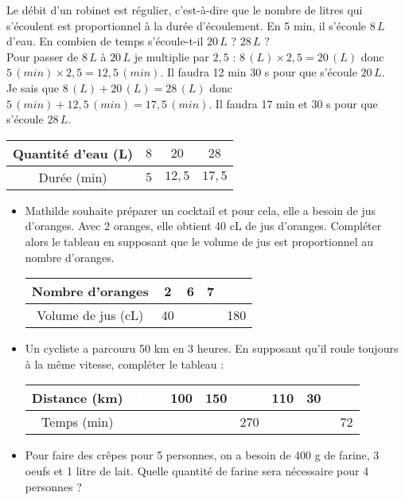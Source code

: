 \documentclass[a4paper,dvipsnames]{article}
\begin{document}
\begin{Ex}
Le débit d'un robinet est régulier, c'est-à-dire que le nombre de litres qui s'écoulent est proportionnel à la durée d'écoulement. En 5 min, il s'écoule $8 \,L$ d'eau. En combien de temps s'écoule-t-il $20 \,L$ ? $28\,L$ ?\\

Pour passer de $8\,L$ à $20\,L$ je multiplie par $2,5$ : $8\,(L)\times2,5=20\,(L)$ donc $5\,(min)\times2,5=12,5\,(min)$. Il faudra 12 min 30 s pour que s'écoule $20\,L$.\\
Je sais que $8\,(L)+20\,(L)=28\,(L)$ donc $5\,(min)+12,5\,(min)=17,5\,(min)$. Il faudra 17 min et 30 s pour que s'écoule $28\,L$.\\
\begin{center}
    \begin{tabular}{c||c|c|c}
        Quantité d'eau (L) & $8$ & $20$ & $28$  \\
        \hline Durée (min) & $5$ & $12,5$ & $17,5$ \\
    \end{tabular}
\end{center}
\end{Ex}

\begin{ExOApp}[]
\begin{itemize}
\item Mathilde souhaite préparer un cocktail et pour cela, elle a besoin de jus d’oranges.
Avec 2 oranges, elle obtient 40 cL de jus d’oranges. Compléter alors le tableau en supposant que le volume de jus est proportionnel au nombre d’oranges.
\begin{center}
    \begin{tabular}{c||c|c|c|c}
        Nombre d'oranges & 2 & 6 & 7 &  \\
        \hline Volume de jus (cL) & 40 &  & & 180 \\
    \end{tabular}
\end{center}
\item Un cycliste a parcouru 50 km en 3 heures. En supposant qu’il roule toujours à la
même vitesse, compléter le tableau :
\begin{center}
    \begin{tabular}{c||c|c|c|c|c|c|c}
        Distance (km) & \textcolor{white}{100} & 100 & 150 &  & 110 & 30 &  \\
        \hline Temps (min) &  &   & & 270 & & & \textcolor{white}{1}72 \\
    \end{tabular}
\end{center}
\item Pour faire des crêpes pour 5 personnes, on a besoin de 400 g de farine, 3 oeufs et
1 litre de lait. Quelle quantité de farine sera nécessaire pour 4 personnes ?
\end{itemize}
\end{ExOApp}
\end{document}
